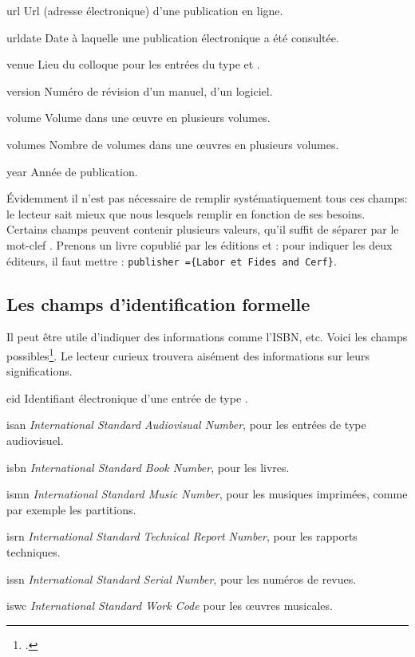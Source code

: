 \begin{choix}
	\item[url] Url (adresse électronique) d'une publication en ligne. 
   	\item[urldate] Date à laquelle une publication électronique a été consultée. 
   	\item[venue] Lieu du colloque pour les entrées du type  et . 
   	\item[version] Numéro de révision d'un manuel, d'un logiciel. 
   	\item[volume] Volume dans une œuvre en plusieurs volumes. 
   	\item[volumes] Nombre de volumes dans une œuvres en plusieurs volumes. 
   	\item[year] Année de publication. 				
\end{choix}


Évidemment il n'est pas nécessaire de remplir  systématiquement tous ces champs: le lecteur sait mieux que nous lesquels remplir en fonction de ses besoins. Certains champs peuvent contenir plusieurs valeurs, qu'il suffit de séparer par le mot-clef . Prenons un livre copublié par les éditions  et  : pour indiquer les deux éditeurs, il faut mettre : \verb|publisher ={Labor et Fides and Cerf}|.




\subsection{Les champs d'identification formelle}

Il peut être utile d'indiquer des informations comme l'ISBN, etc. Voici les champs possibles\footcite[Par défaut,  imprime ces champs s'ils sont remplis. Il est toutefois possible de ne pas les afficher en passant l'option  au chargement du package, voir:][]{biblatex_isbn}.  Le lecteur curieux trouvera aisément des informations sur leurs significations.

\begin{choix}
	\item[eid] Identifiant électronique d'une entrée de type . 
   	\item[isan] \emph{\textenglish{International Standard Audiovisual Number}}, pour les entrées de type audiovisuel.
   	\item[isbn] \emph{\textenglish{International Standard Book Number}}, pour les livres. 
   	\item[ismn] \emph{\textenglish{International Standard Music Number}}, pour les musiques imprimées, comme par exemple les partitions. 
   	\item[isrn] \emph{\textenglish{International Standard Technical Report Number}}, pour les rapports techniques. 
   	\item[issn] \emph{\textenglish{International Standard Serial Number}}, pour les numéros de revues. 
   	\item[iswc] \emph{\textenglish{International Standard Work Code}} pour les œuvres musicales.
\end{choix}

